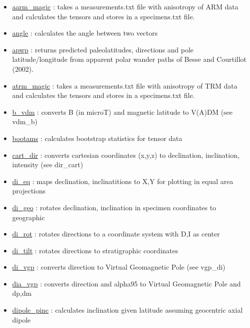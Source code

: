 \documentclass[11pt]{book}
\begin{document}
{{\begin{itemize}
\item \href{http://pmagpy.github.io/PmagPy.html#aarm_magic}{aarm\_magic} : takes a measurements.txt file with anisotropy of ARM data and calculates the tensors and stores in a specimens.txt file.
\item \href{http://pmagpy.github.io/PmagPy.html#angle}{angle} : calculates the angle between two vectors
\item \href{http://pmagpy.github.io/PmagPy.html#apwp}{apwp} : returns predicted paleolatitudes, directions and pole latitude/longitude from apparent polar wander paths of Besse and Courtillot (2002).
\item \href{http://pmagpy.github.io/PmagPy.html#atrm_magic}{atrm\_magic} : takes a measurements.txt file with anisotropy of TRM data and calculates the tensors and stores in a specimens.txt file.
\item \href{http://pmagpy.github.io/PmagPy.html#b_vdm}{b\_vdm} : converts B (in microT) and magnetic latitude to V(A)DM (see vdm\_b)
\item \href{http://pmagpy.github.io/PmagPy.html#bootams}{bootams} : calculates bootstrap statistics for tensor data
\item \href{http://pmagpy.github.io/PmagPy.html#cart_dir}{cart\_dir} : converts cartesian coordinates (x,y,z) to declination, inclination, intensity (see dir\_cart)
\item \href{http://pmagpy.github.io/PmagPy.html#di_eq}{di\_eq} : maps declination, inclinatitions to X,Y for plotting in equal area projections
\item \href{http://pmagpy.github.io/PmagPy.html#di_geo}{di\_geo} : rotates declination, inclination in specimen coordinates to geographic
\item \href{http://pmagpy.github.io/PmagPy.html#di_rot}{di\_rot} : rotates directions to a  coordinate system with D,I as center
\item \href{http://pmagpy.github.io/PmagPy.html#di_tilt}{di\_tilt} : rotates directions to stratigraphic coordinates
\item \href{http://pmagpy.github.io/PmagPy.html#di_vgp}{di\_vgp} : converts direction to Virtual Geomagnetic Pole (see vgp\_di)
\item \href{http://pmagpy.github.io/PmagPy.html#dia_vgp}{dia\_vgp} : converts direction and alpha95 to Virtual Geomagnetic Pole and dp,dm
\item \href{http://pmagpy.github.io/PmagPy.html#dipole_pinc}{dipole\_pinc} : calculates inclination given latitude assuming geocentric axial dipole

\end{itemize}}}
\end{document}
